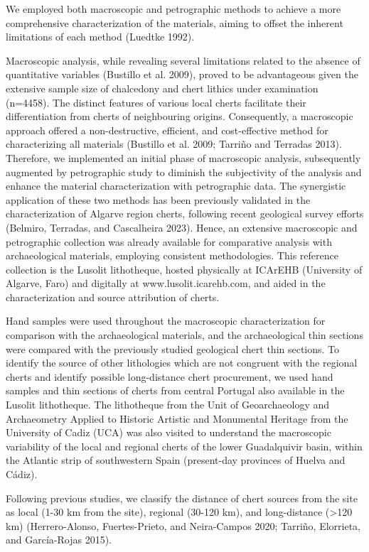 \documentclass[
  a4paper,
  DIV=11,
  numbers=noendperiod]{scrreprt}
\begin{document}
We employed both macroscopic and petrographic methods to achieve a more
comprehensive characterization of the materials, aiming to offset the
inherent limitations of each method (Luedtke 1992).

Macroscopic analysis, while revealing several limitations related to the
absence of quantitative variables (Bustillo et al. 2009), proved to be
advantageous given the extensive sample size of chalcedony and chert
lithics under examination (n=4458). The distinct features of various
local cherts facilitate their differentiation from cherts of
neighbouring origins. Consequently, a macroscopic approach offered a
non-destructive, efficient, and cost-effective method for characterizing
all materials (Bustillo et al. 2009; Tarriño and Terradas 2013).
Therefore, we implemented an initial phase of macroscopic analysis,
subsequently augmented by petrographic study to diminish the
subjectivity of the analysis and enhance the material characterization
with petrographic data. The synergistic application of these two methods
has been previously validated in the characterization of Algarve region
cherts, following recent geological survey efforts (Belmiro, Terradas,
and Cascalheira 2023). Hence, an extensive macroscopic and petrographic
collection was already available for comparative analysis with
archaeological materials, employing consistent methodologies. This
reference collection is the Lusolit lithotheque, hosted physically at
ICArEHB (University of Algarve, Faro) and digitally at
www.lusolit.icarehb.com, and aided in the characterization and source
attribution of cherts.

Hand samples were used throughout the macroscopic characterization for
comparison with the archaeological materials, and the archaeological
thin sections were compared with the previously studied geological chert
thin sections. To identify the source of other lithologies which are not
congruent with the regional cherts and identify possible long-distance
chert procurement, we used hand samples and thin sections of cherts from
central Portugal also available in the Lusolit lithotheque. The
lithotheque from the Unit of Geoarchaeology and Archaeometry Applied to
Historic Artistic and Monumental Heritage from the University of Cadiz
(UCA) was also visited to understand the macroscopic variability of the
local and regional cherts of the lower Guadalquivir basin, within the
Atlantic strip of southwestern Spain (present-day provinces of Huelva
and Cádiz).

Following previous studies, we classify the distance of chert sources
from the site as local (1-30 km from the site), regional (30-120 km),
and long-distance (\textgreater120 km) (Herrero-Alonso, Fuertes-Prieto,
and Neira-Campos 2020; Tarriño, Elorrieta, and García-Rojas 2015).
\end{document}
